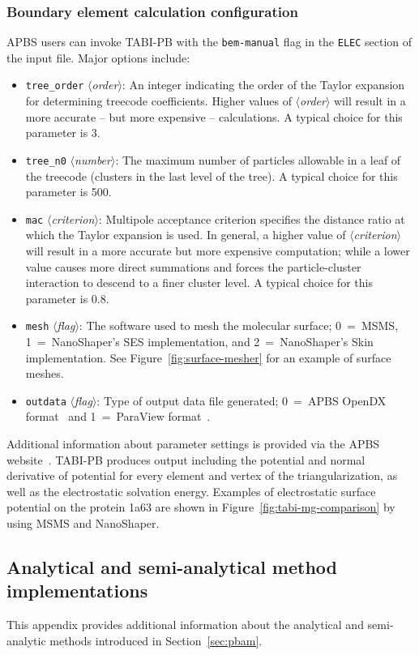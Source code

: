 \documentclass[12pt,titlepage]{article}
\newcommand{\keyword}[1]{\texttt{#1}}
\newcommand{\param}[1]{$\langle$\textit{#1}$\rangle$}
\begin{document}
\subsubsection{Boundary element calculation configuration}
APBS users can invoke TABI-PB with the \keyword{bem-manual} flag in the \keyword{ELEC} section of the input file.
Major options include:
\begin{itemize}
	\item \keyword{tree\_order} \param{order}:  An integer indicating the order of the Taylor expansion for determining treecode coefficients.
	Higher values of \param{order} will result in a more accurate -- but more expensive --  calculations.
	A typical choice for this parameter is 3.
	\item \keyword{tree\_n0} \param{number}:  The maximum number of particles allowable in a leaf of the treecode (clusters in the last level of the tree).
	A typical choice for this parameter is 500.
	\item \keyword{mac} \param{criterion}:  Multipole acceptance criterion specifies the distance ratio at which the Taylor expansion is used.
	In general, a higher value of \param{criterion} will result in a more accurate but more expensive computation; while a lower value causes more direct summations and forces the particle-cluster interaction to descend to a finer cluster level. 
	A typical choice for this parameter is 0.8.
	\item \keyword{mesh} \param{flag}:  The software used to mesh the molecular surface; 0~=~MSMS, 1~=~Nano\-Shaper's SES implementation, and 2~=~NanoShaper's Skin implementation.
	See Figure~\ref{fig:surface-mesher} for an example of surface meshes.
	\item \keyword{outdata} \param{flag}: Type of output data file generated; 0~=~APBS OpenDX format~\cite{OpenDX} and 1~=~ParaView format~\cite{ParaView}.
\end{itemize}
Additional information about parameter settings is provided via the APBS website~\cite{APBSweb}. 
TABI-PB produces output including the potential and normal derivative of potential for every element and vertex of the triangularization, as well as the electrostatic solvation energy.
Examples of electrostatic surface potential on the protein 1a63 are shown in Figure~\ref{fig:tabi-mg-comparison} by using MSMS and NanoShaper.

\subsection{Analytical and semi-analytical method implementations} \label{app:pbam}
This appendix provides additional information about the analytical and semi-analytic methods \cite{Felberg2017, Lotan2006} introduced in Section~\ref{sec:pbam}.
\end{document}
